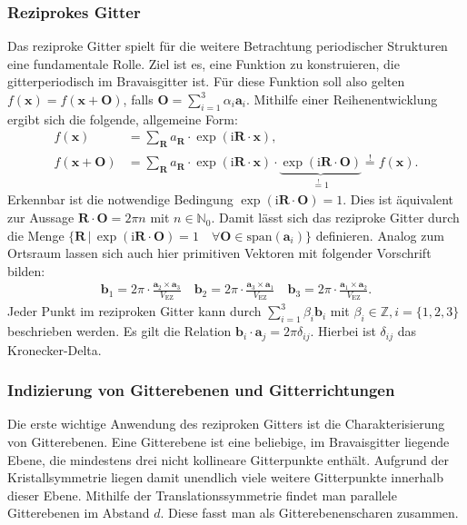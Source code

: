 \subsubsection{Reziprokes Gitter}
Das reziproke Gitter spielt für die weitere Betrachtung periodischer Strukturen eine fundamentale Rolle.
Ziel ist es, eine Funktion zu konstruieren, die gitterperiodisch im Bravaisgitter ist.
Für diese Funktion soll also gelten
$f(\mathbf{x})=f(\mathbf{x}+\mathbf{O})$, falls $\mathbf{O}=\sum_{i=1}^{3} \alpha_{i}\mathbf{a}_{i}$.
Mithilfe einer Reihenentwicklung ergibt sich die folgende, allgemeine Form:
\begin{align}
    f(\mathbf{x})&=\sum_{\mathbf{R}}a_{\mathbf{R}}\cdot \exp(\mathrm{i}\mathbf{R}\cdot\mathbf{x}),\\
    f(\mathbf{x}+\mathbf{O})&=\sum_{\mathbf{R}}a_{\mathbf{R}}\cdot \exp(\mathrm{i}\mathbf{R}\cdot \mathbf{x})\cdot
    \underbrace{ \exp(\mathrm{i}\mathbf{R}\cdot \mathbf{O}) }_{ \stackrel{!}{=}1 }  \stackrel{!}{=} f(\mathbf{x}).
\end{align}
Erkennbar ist die notwendige Bedingung $\exp(\mathrm{i}\mathbf{R}\cdot \mathbf{O})=1$.
Dies ist äquivalent zur Aussage $\mathbf{R}\cdot \mathbf{O}=2\pi n$ mit $n \in \mathbb{N}_{0}$.
Damit lässt sich das reziproke Gitter durch die Menge
$\{ \mathbf{R} \,\vert\, \exp(\mathrm{i}\mathbf{R}\cdot \mathbf{O})=1 \quad
\forall \mathbf{O} \in \text{span}(\mathbf{a}_{i}) \}$ definieren. \autocite[108]{Ashcroft}
Analog zum Ortsraum lassen sich auch hier primitiven Vektoren mit folgender Vorschrift bilden:
\begin{align*}
    \mathbf{b}_{1} = 2\pi \cdot \frac{\mathbf{a}_{2} \times \mathbf{a}_{3}}{V_{\mathrm{EZ}}} \quad
    \mathbf{b}_{2} = 2\pi \cdot \frac{\mathbf{a}_{3} \times \mathbf{a}_{1}}{V_{\mathrm{EZ}}} \quad
    \mathbf{b}_{3} = 2\pi \cdot \frac{\mathbf{a}_{1} \times \mathbf{a}_{2}}{V_{\mathrm{EZ}}}.
\end{align*}
Jeder Punkt im reziproken Gitter kann durch $\sum_{i=1}^{3} \beta_{i}\mathbf{b}_{i}$ mit $\beta_i \in \mathbb{Z}, i=\{1,2,3\}$
beschrieben werden.
Es gilt die Relation $\mathbf{b}_{i}\cdot \mathbf{a}_{j}=2 \pi \delta_{ij}$.
Hierbei ist $\delta_{ij}$ das Kronecker-Delta.
\autocite[109]{Ashcroft}

\subsubsection{Indizierung von Gitterebenen und Gitterrichtungen}\label{subsubsec:indizierung}
Die erste wichtige Anwendung des reziproken Gitters ist die Charakterisierung von Gitterebenen.
Eine Gitterebene ist eine beliebige, im Bravaisgitter liegende Ebene, die mindestens drei nicht kollineare Gitterpunkte
enthält.
Aufgrund der Kristallsymmetrie liegen damit unendlich viele weitere Gitterpunkte innerhalb dieser Ebene.
Mithilfe der Translationssymmetrie findet man parallele Gitterebenen im Abstand $d$.
Diese fasst man als Gitterebenenscharen zusammen. \autocite[113]{Ashcroft}

